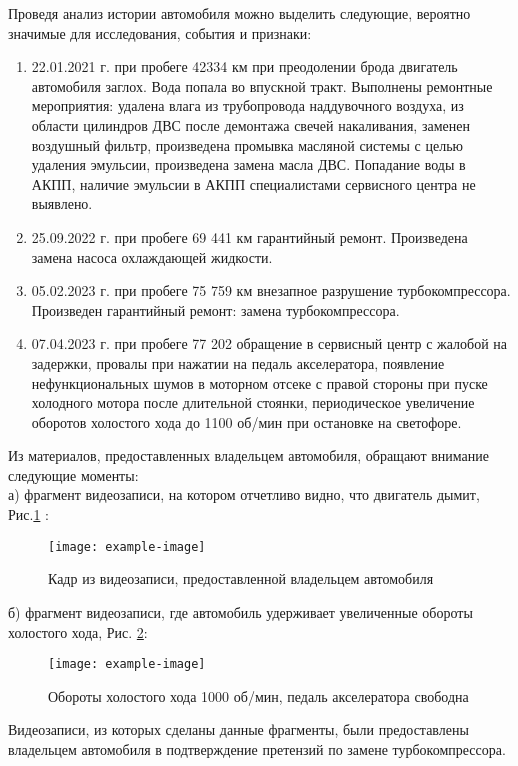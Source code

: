 {\noindent Проведя анализ истории автомобиля  можно выделить следующие, вероятно  значимые для исследования, события и признаки:
\begin{enumerate}
\item  
22.01.2021 г. при пробеге 42334 км  при преодолении брода двигатель автомобиля заглох. Вода попала во впускной тракт. Выполнены ремонтные мероприятия: удалена влага из трубопровода наддувочного воздуха, из области цилиндров ДВС после демонтажа свечей накаливания, заменен воздушный фильтр, произведена промывка масляной системы с целью удаления эмульсии, произведена замена масла ДВС. Попадание воды в АКПП, наличие эмульсии в АКПП специалистами сервисного центра не выявлено.
\item 
25.09.2022 г. при пробеге 69 441 км гарантийный ремонт.  Произведена замена насоса охлаждающей жидкости.
\item 
05.02.2023 г. при пробеге 75 759 км внезапное разрушение турбокомпрессора. Произведен гарантийный ремонт: замена турбокомпрессора.
\item 
07.04.2023 г. при пробеге 77 202 обращение в сервисный центр с жалобой на задержки, провалы при нажатии на педаль акселератора, появление нефункциональных шумов в моторном отсеке с правой стороны при пуске холодного мотора после длительной стоянки, периодическое увеличение оборотов холостого хода до 1100 об/мин при остановке на светофоре.
\end{enumerate}
\vspace{5mm}
Из материалов, предоставленных владельцем автомобиля, обращают внимание следующие моменты:\\
а) фрагмент видеозаписи, на котором отчетливо видно, что двигатель дымит, Рис.\ref{dimit} :\\

\begin{figure}[H]
	\centering
	\texttt{[image: example-image]}
	\caption{Кадр из видеозаписи, предоставленной владельцем автомобиля}
	\label{dimit}
\end{figure}
б) фрагмент видеозаписи, где автомобиль удерживает увеличенные обороты  холостого хода, Рис. \ref{fig:1000}:

\begin{figure}[H]
	\centering
	\texttt{[image: example-image]}
	\caption{Обороты холостого хода 1000 об/мин, педаль акселератора свободна}
	\label{fig:1000}
\end{figure}

Видеозаписи, из которых  сделаны данные фрагменты, были предоставлены владельцем автомобиля в подтверждение претензий по замене турбокомпрессора.


}
